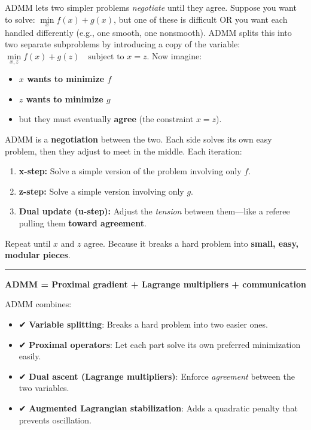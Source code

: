 \documentclass[11pt]{article}
\providecommand{\tightlist}{%
      \setlength{\itemsep}{0pt}\setlength{\parskip}{0pt}}
\begin{document}
ADMM lets two simpler problems \emph{negotiate} until they agree.
Suppose you want to solve: \(\underset{x}{\min} f(x) + g(x)\), but one
of these is difficult OR you want each handled differently (e.g., one
smooth, one nonsmooth). ADMM splits this into two separate subproblems
by introducing a copy of the variable:
\(\underset{x,z}{\min} f(x) + g(z) \quad \text{subject to } x=z\). Now
imagine:

\begin{itemize}
\tightlist
\item
  \textbf{\(x\) wants to minimize \(f\)}
\item
  \textbf{\(z\) wants to minimize \(g\)}
\item
  but they must eventually \textbf{agree} (the constraint \(x=z\)).
\end{itemize}

ADMM is a \textbf{negotiation} between the two. Each side solves its own
easy problem, then they adjust to meet in the middle. Each iteration:

\begin{enumerate}
\def\labelenumi{\arabic{enumi}.}
\item
  \textbf{x-step:} Solve a simple version of the problem involving only
  \(f\).
\item
  \textbf{z-step:} Solve a simple version involving only \(g\).
\item
  \textbf{Dual update (u-step):} Adjust the \emph{tension} between
  them---like a referee pulling them \textbf{toward agreement}.
\end{enumerate}

Repeat until \(x\) and \(z\) agree. Because it breaks a hard problem
into \textbf{small, easy, modular pieces}.

\begin{center}\rule{0.5\linewidth}{0.5pt}\end{center}

\textbf{ADMM = Proximal gradient + Lagrange multipliers + communication}

ADMM combines:

\begin{itemize}
\tightlist
\item
  ✔ \textbf{Variable splitting}: Breaks a hard problem into two easier
  ones.
\item
  ✔ \textbf{Proximal operators}: Let each part solve its own preferred
  minimization easily.
\item
  ✔ \textbf{Dual ascent (Lagrange multipliers)}: Enforce
  \emph{agreement} between the two variables.
\item
  ✔ \textbf{Augmented Lagrangian stabilization}: Adds a quadratic
  penalty that prevents oscillation.
\end{itemize}
\end{document}

